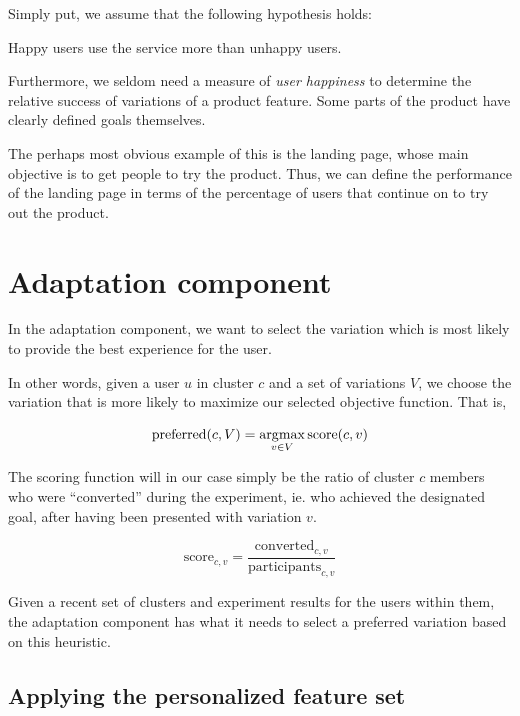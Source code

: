 Simply put, we assume that the following hypothesis holds:

\begin{hypothesis}
  Happy users use the service more than unhappy users.
\end{hypothesis}

Furthermore, we seldom need a measure of \emph{user happiness} to determine the relative success of variations of a product feature. Some parts of the product have clearly defined goals themselves.

The perhaps most obvious example of this is the landing page, whose main objective is to get people to try the product. Thus, we can define the performance of the landing page in terms of the percentage of users that continue on to try out the product.

\section{Adaptation component} %
\label{approach:sec:adaptation_component}

In the adaptation component, we want to select the variation which is most likely to provide the best experience for the user.

In other words, given a user $u$ in cluster $c$ and a set of variations $V$, we choose the variation that is more likely to maximize our selected objective function. That is,

\begin{equation}
  \text{preferred}(c, V) = \operatorname*{\arg\!\max}_{v \in V} \text{score}(c, v)
\end{equation}

The scoring function will in our case simply be the ratio of cluster $c$ members who were ``converted'' during the experiment, ie. who achieved the designated goal, after having been presented with variation $v$.

\begin{equation}
  \text{score}_{c,v} = \frac{\text{converted}_{c,v}}{\text{participants}_{c,v}}
\end{equation}

Given a recent set of clusters and experiment results for the users within them, the adaptation component has what it needs to select a preferred variation based on this heuristic.

\subsection{Applying the personalized feature set} %
\label{approach:sec:applying_the_personalized_feature_set}

